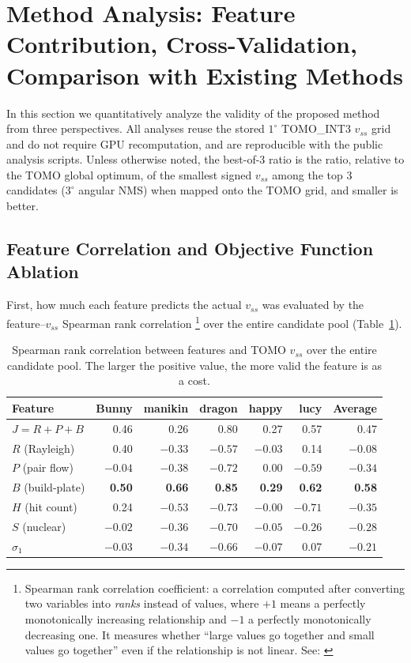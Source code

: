 \documentclass[11pt,a4paper]{article}
\begin{document}
\section{Method Analysis: Feature Contribution, Cross-Validation, Comparison with Existing Methods}

In this section we quantitatively analyze the validity of the proposed method from three perspectives.
All analyses reuse the stored $1^\circ$ TOMO\_INT3 $v_{ss}$ grid and do not require GPU recomputation,
and are reproducible with the public analysis scripts.
Unless otherwise noted, the best-of-3 ratio is the ratio, relative to the TOMO global optimum, of the smallest signed $v_{ss}$
among the top 3 candidates ($3^\circ$ angular NMS) when mapped onto the TOMO grid, and smaller is better.

\subsection{Feature Correlation and Objective Function Ablation}
\label{sec:ablation}

First, how much each feature predicts the actual $v_{ss}$ was evaluated by the
feature--$v_{ss}$ Spearman rank correlation%
\footnote{Spearman rank correlation coefficient: a correlation computed after converting two variables into \emph{ranks} instead of values,
where $+1$ means a perfectly monotonically increasing relationship and $-1$ a perfectly monotonically decreasing one. It measures whether
``large values go together and small values go together'' even if the relationship is not linear. See: \cite{spearman1904}}
over the entire candidate pool (Table~\ref{tab:feature-corr}).

\begin{table}[H]
\centering
\caption{Spearman rank correlation between features and TOMO $v_{ss}$ over the entire candidate pool.
The larger the positive value, the more valid the feature is as a cost.}
\label{tab:feature-corr}
\begin{tabular}{lrrrrrr}
\toprule
Feature & Bunny & manikin & dragon & happy & lucy & Average\\
\midrule
$J=R{+}P{+}B$         & 0.46 & 0.26 & 0.80 & 0.27 & 0.57 & 0.47\\
$R$ (Rayleigh)        & 0.40 & $-0.33$ & $-0.57$ & $-0.03$ & 0.14 & $-0.08$\\
$P$ (pair flow)       & $-0.04$ & $-0.38$ & $-0.72$ & 0.00 & $-0.59$ & $-0.34$\\
$B$ (build-plate)     & \textbf{0.50} & \textbf{0.66} & \textbf{0.85} & \textbf{0.29} & \textbf{0.62} & \textbf{0.58}\\
$H$ (hit count)       & 0.24 & $-0.53$ & $-0.73$ & $-0.00$ & $-0.71$ & $-0.35$\\
$S$ (nuclear)         & $-0.02$ & $-0.36$ & $-0.70$ & $-0.05$ & $-0.26$ & $-0.28$\\
$\sigma_1$            & $-0.03$ & $-0.34$ & $-0.66$ & $-0.07$ & 0.07 & $-0.21$\\
\bottomrule
\end{tabular}
\end{table}
\end{document}
